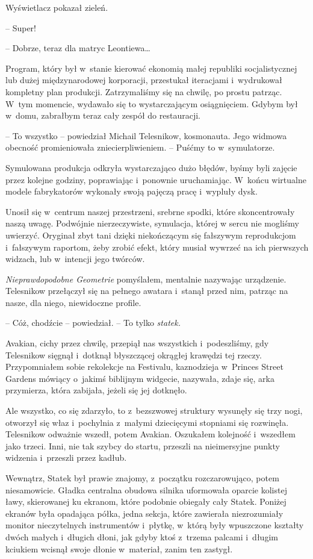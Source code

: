 \documentclass[oneside,polish,12pt,sfheadings]{mwbk}
\begin{document}
Wyświetlacz pokazał zieleń.

-- Super!

-- Dobrze, teraz dla matryc Leontiewa\ldots

Program, który był w~stanie kierować ekonomią małej republiki
socjalistycznej lub dużej międzynarodowej korporacji, przestukał
iteracjami i~wydrukował kompletny plan produkcji. Zatrzymaliśmy się na
chwilę, po prostu patrząc. W~tym momencie, wydawało się to
wystarczającym osiągnięciem. Gdybym był w~domu, zabrałbym teraz cały
zespół do restauracji.

-- To wszystko -- powiedział Michail Telesnikow, kosmonauta. Jego widmowa
obecność promieniowała zniecierpliwieniem. -- Puśćmy to w~symulatorze.

Symulowana produkcja odkryła wystarczająco dużo błędów, byśmy byli zajęcie
przez kolejne godziny, poprawiając i~ponownie uruchamiając. W~końcu
wirtualne modele fabrykatorów wykonały swoją pajęczą pracę i~wypluły
dysk.

Unosił się w~centrum naszej przestrzeni, srebrne spodki, które
skoncentrowały naszą uwagę. Podwójnie nierzeczywiste, symulacja, której
w sercu nie mogliśmy uwierzyć. Oryginał zbyt tani dzięki niekończącym
się fałszywym reprodukcjom i~fałszywym raportom, żeby zrobić efekt,
który musiał wywrzeć na ich pierwszych widzach, lub w~intencji jego
twórców.

\emph{Nieprawdopodobne Geometrie} pomyślałem, mentalnie nazywając
urządzenie. Telesnikow przełączył się na pełnego awatara i~stanął przed
nim, patrząc na nasze, dla niego, niewidoczne profile.

-- Cóż, chodźcie -- powiedział. -- To tylko \emph{statek.}

Avakian, cichy przez chwilę, przepiął nas wszystkich i~podeszliśmy, gdy
Telesnikow sięgnął i~dotknął błyszczącej okrągłej krawędzi tej rzeczy.
Przypomniałem sobie rekolekcje na Festivalu, kaznodzieja w~Princes
Street Gardens mówiący o~jakimś biblijnym widgecie, nazywała, zdaje się,
arka przymierza, która zabijała, jeżeli się jej dotknęło.

Ale wszystko, co się zdarzyło, to z~bezszwowej struktury wysunęły się
trzy nogi, otworzył się właz i~pochylnia z~małymi dziecięcymi stopniami
się rozwinęła. Telesnikow odważnie wszedł, potem Avakian. Oszukałem
kolejność i~wszedłem jako trzeci. Inni, nie tak szybcy do startu,
przeszli na nieimersyjne punkty widzenia i~przeszli przez kadłub.

Wewnątrz, Statek był prawie znajomy, z~początku rozczarowująco, potem
niesamowicie. Gładka centralna obudowa silnika uformowała oparcie
kolistej ławy, skierowanej ku ekranom, które podobnie obiegały cały
Statek. Poniżej ekranów była opadająca półka, jedna sekcja, które
zawierała niezrozumiały monitor nieczytelnych instrumentów i~płytkę, w~którą były wpuszczone kształty dwóch małych i~długich dłoni, jak gdyby
ktoś z~trzema palcami i~długim kciukiem wcisnął swoje dłonie w~materiał,
zanim ten zastygł.
\end{document}
